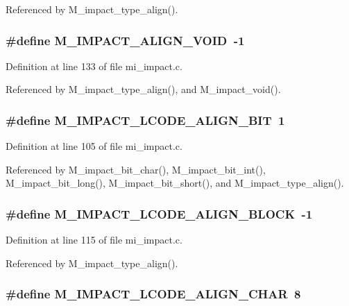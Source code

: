 Referenced by M\_\-impact\_\-type\_\-align().
\subsubsection{\setlength{\rightskip}{0pt plus 5cm}\#define M\_\-IMPACT\_\-ALIGN\_\-VOID~-1}\label{mi__impact_8c_05e51ea689c646304b2422fd6ba3307c}




Definition at line 133 of file mi\_\-impact.c.

Referenced by M\_\-impact\_\-type\_\-align(), and M\_\-impact\_\-void().
\subsubsection{\setlength{\rightskip}{0pt plus 5cm}\#define M\_\-IMPACT\_\-LCODE\_\-ALIGN\_\-BIT~1}\label{mi__impact_8c_2b9d5ea14aa692b7f6f31780c61b87c3}




Definition at line 105 of file mi\_\-impact.c.

Referenced by M\_\-impact\_\-bit\_\-char(), M\_\-impact\_\-bit\_\-int(), M\_\-impact\_\-bit\_\-long(), M\_\-impact\_\-bit\_\-short(), and M\_\-impact\_\-type\_\-align().
\subsubsection{\setlength{\rightskip}{0pt plus 5cm}\#define M\_\-IMPACT\_\-LCODE\_\-ALIGN\_\-BLOCK~-1}\label{mi__impact_8c_5e9ebda09cc5a5d0fa76c1cbce8f8129}




Definition at line 115 of file mi\_\-impact.c.

Referenced by M\_\-impact\_\-type\_\-align().
\subsubsection{\setlength{\rightskip}{0pt plus 5cm}\#define M\_\-IMPACT\_\-LCODE\_\-ALIGN\_\-CHAR~8}\label{mi__impact_8c_45e04b3144ec92fdedab4cce4d8580a6}




